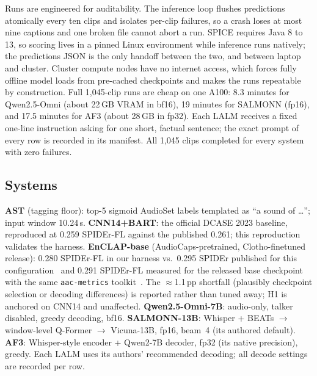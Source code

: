 \documentclass[conference]{IEEEtran}
\begin{document}
Runs are engineered for auditability. The inference loop flushes predictions
atomically every ten clips and isolates per-clip failures, so a crash loses at
most nine captions and one broken file cannot abort a run. SPICE requires
Java 8 to 13, so scoring lives in a pinned Linux environment while inference
runs natively; the predictions JSON is the only handoff between the two, and
between laptop and cluster. Cluster compute nodes have no internet access,
which forces fully offline model loads from pre-cached checkpoints and makes
the runs repeatable by construction. Full 1{,}045-clip runs are cheap on one
A100: 8.3 minutes for Qwen2.5-Omni (about 22\,GB VRAM in bf16), 19 minutes
for SALMONN (fp16), and 17.5 minutes for AF3 (about 28\,GB in fp32). Each
LALM receives a fixed one-line instruction asking for one short, factual
sentence; the exact prompt of every row is recorded in its manifest. All
1{,}045 clips completed for every system with zero failures.

\subsection{Systems}
\textbf{AST} (tagging floor): top-5 sigmoid AudioSet labels templated as ``a
sound of \dots''; input window 10.24\,s. \textbf{CNN14+BART}: the official
DCASE 2023 baseline, reproduced at 0.259 SPIDEr-FL against the published
0.261; this reproduction validates the harness. \textbf{EnCLAP-base}
(AudioCaps-pretrained, Clotho-finetuned release): 0.280 SPIDEr-FL in our
harness vs.\ 0.295 SPIDEr published for this configuration~\cite{kim2024enclap}
and 0.291 SPIDEr-FL measured for the released base checkpoint with the same
\texttt{aac-metrics} toolkit~\cite{kim2024enclappp}. The $\approx$1.1\,pp
shortfall (plausibly checkpoint selection or decoding differences) is reported
rather than tuned away; H1 is anchored on CNN14 and unaffected. \textbf{Qwen2.5-Omni-7B}: audio-only,
talker disabled, greedy decoding, bf16. \textbf{SALMONN-13B}: Whisper +
BEATs $\rightarrow$ window-level Q-Former $\rightarrow$ Vicuna-13B, fp16,
beam~4 (its authored default). \textbf{AF3}: Whisper-style encoder +
Qwen2-7B decoder, fp32 (its native precision), greedy. Each LALM uses its
authors' recommended decoding; all decode settings are recorded per row.
\end{document}
